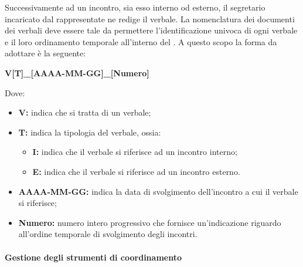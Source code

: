 				Successivamente ad un incontro, sia esso interno od esterno, il segretario incaricato dal rappresentate ne redige il verbale.
				\newline
				La nomenclatura dei documenti dei verbali deve essere tale da permettere l'identificazione univoca di ogni verbale e il loro ordinamento temporale all'interno del . A questo scopo la forma da adottare è la seguente:
				\begin{center}
					\textbf{V[T]\_[AAAA-MM-GG]\_[Numero]}
				\end{center}
				Dove:
				\begin{itemize}
					\item \textbf{V:} indica che si tratta di un verbale;
					\item \textbf{T:} indica la tipologia del verbale, ossia:
					\begin{itemize}
						\item \textbf{I:} indica che il verbale si riferisce ad un incontro interno;
						\item \textbf{E:} indica che il verbale si riferisce ad un incontro esterno.
					\end{itemize}
					\item \textbf{AAAA-MM-GG:} indica la data di svolgimento dell'incontro a cui il verbale si riferisce;
					\item \textbf{Numero:} numero intero progressivo che fornisce un'indicazione riguardo all'ordine temporale di svolgimento degli incontri.
				\end{itemize}
		
		\paragraph{Gestione degli strumenti di coordinamento}

